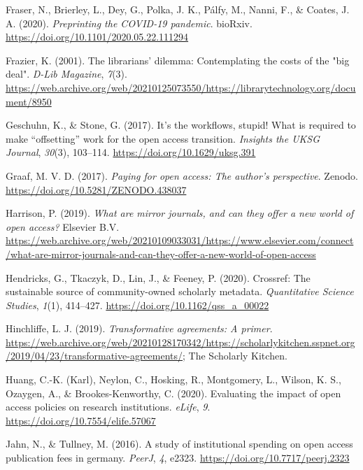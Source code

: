 \documentclass[a4paper,man,floatsintext,longtable,noextraspace,12pt]{apa6}
\newlength{\cslhangindent}
\newenvironment{cslreferences}%
  {\setlength{\parindent}{0pt}%
  \everypar{\setlength{\hangindent}{\cslhangindent}}\ignorespaces}%
  {\par}
\begin{document}
\begin{cslreferences}
\leavevmode\hypertarget{ref-Fraser_2020}{}%
Fraser, N., Brierley, L., Dey, G., Polka, J. K., Pálfy, M., Nanni, F.,
\& Coates, J. A. (2020). \emph{Preprinting the COVID-19 pandemic}.
bioRxiv. \url{https://doi.org/10.1101/2020.05.22.111294}

\leavevmode\hypertarget{ref-Frazier_2001}{}%
Frazier, K. (2001). The librarians' dilemma: Contemplating the costs of
the "big deal". \emph{D-Lib Magazine}, \emph{7}(3).
\url{https://web.archive.org/web/20210125073550/https://librarytechnology.org/document/8950}

\leavevmode\hypertarget{ref-Geschuhn_2017}{}%
Geschuhn, K., \& Stone, G. (2017). It's the workflows, stupid! What is
required to make ``offsetting'' work for the open access transition.
\emph{Insights the UKSG Journal}, \emph{30}(3), 103--114.
\url{https://doi.org/10.1629/uksg.391}

\leavevmode\hypertarget{ref-Graaf_2017}{}%
Graaf, M. V. D. (2017). \emph{Paying for open access: The author's
perspective}. Zenodo. \url{https://doi.org/10.5281/ZENODO.438037}

\leavevmode\hypertarget{ref-Harrison_2019}{}%
Harrison, P. (2019). \emph{What are mirror journals, and can they offer
a new world of open access?} Elsevier B.V.
\url{https://web.archive.org/web/20210109033031/https://www.elsevier.com/connect/what-are-mirror-journals-and-can-they-offer-a-new-world-of-open-access}

\leavevmode\hypertarget{ref-Hendricks_2020}{}%
Hendricks, G., Tkaczyk, D., Lin, J., \& Feeney, P. (2020). Crossref: The
sustainable source of community-owned scholarly metadata.
\emph{Quantitative Science Studies}, \emph{1}(1), 414--427.
\url{https://doi.org/10.1162/qss_a_00022}

\leavevmode\hypertarget{ref-Hinchliffe_2019}{}%
Hinchliffe, L. J. (2019). \emph{Transformative agreements: A primer}.
\url{https://web.archive.org/web/20210128170342/https://scholarlykitchen.sspnet.org/2019/04/23/transformative-agreements/};
The Scholarly Kitchen.

\leavevmode\hypertarget{ref-Huang_2020}{}%
Huang, C.-K. (Karl), Neylon, C., Hosking, R., Montgomery, L., Wilson, K.
S., Ozaygen, A., \& Brookes-Kenworthy, C. (2020). Evaluating the impact
of open access policies on research institutions. \emph{eLife},
\emph{9}. \url{https://doi.org/10.7554/elife.57067}

\leavevmode\hypertarget{ref-Jahn_2016}{}%
Jahn, N., \& Tullney, M. (2016). A study of institutional spending on
open access publication fees in germany. \emph{PeerJ}, \emph{4}, e2323.
\url{https://doi.org/10.7717/peerj.2323}


\end{cslreferences}
\end{document}
